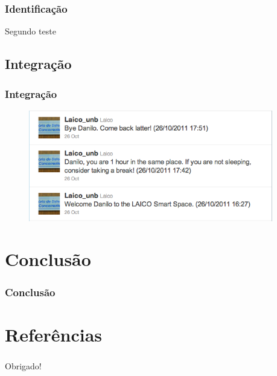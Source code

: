 \documentclass{beamer}
\begin{document}
	    \begin{frame}
	    	\frametitle{Identificação}
	    	
	    	Segundo teste
	    \end{frame}
	    
    \subsection{Integração}
	    \begin{frame}
	    	\frametitle{Integração}
	    	
	    	\begin{figure}[htb]
				\begin{center}
					\includegraphics[width=0.95\textwidth]{figuras/5.Testes/tweets.png}
				\end{center}
			\end{figure}
	    \end{frame}
	    
\section{Conclusão}

	\begin{frame}
		\frametitle{Conclusão}
	\end{frame}
	
\nocite{fabriciobuzzeto,weiser2,saocarlos,yang,hewitt,violajones}

\section{Referências}


\begin{frame}
    \frametitle{ }
    \centerline{Obrigado!}
\end{frame}
\end{document}
